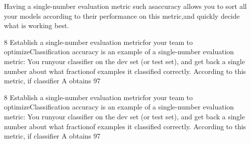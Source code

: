  Having  a  single-number  evaluation  metric​  such  asaccuracy  allows  you  to  sort  all  your  models  according  to  their  performance  on  this  metric,and  quickly  decide  what  is  working  best.
 
 8  Establish  a  single-number  evaluation  metricfor  your  team  to  optimizeClassification  accuracy  is  an  example  of  a  single-number  evaluation  metric​:  You  runyour  classifier  on  the  dev  set  (or  test  set),  and  get  back  a  single  number  about  what  fractionof  examples  it  classified  correctly.  According  to  this  metric,  if  classifier  A  obtains  97%
 
 
 8  Establish  a  single-number  evaluation  metricfor  your  team  to  optimizeClassification  accuracy  is  an  example  of  a  single-number  evaluation  metric​:  You  runyour  classifier  on  the  dev  set  (or  test  set),  and  get  back  a  single  number  about  what  fractionof  examples  it  classified  correctly.  According  to  this  metric,  if  classifier  A  obtains  97%
 
